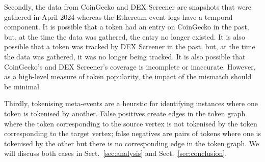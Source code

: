 Secondly, the data from CoinGecko and DEX Screener are snapshots that
were gathered in April 2024 whereas the Ethereum event logs have a
temporal component.  It is possible that a token had an entry on
CoinGecko in the past, but, at the time the data was gathered, the
entry no longer existed.  It is also possible that a token was tracked
by DEX Screener in the past, but, at the time the data was gathered,
it was no longer being tracked.  It is also possible that CoinGecko's
and DEX Screener's coverage is incomplete or inaccurate.  However, as
a high-level measure of token popularity, the impact of the mismatch
should be minimal.

Thirdly, tokenising meta-events are a heurstic for identifying
instances where one token is tokenised by another.  False positives
create edges in the token graph where the token corresponding to the
source vertex is not tokenised by the token corresponding to the
target vertex; false negatives are pairs of tokens where one is
tokenised by the other but there is no corresponding edge in the token
graph.  We will discuss both cases in Sect.~\ref{sec:analysis} and
Sect.~\ref{sec:conclusion}.
